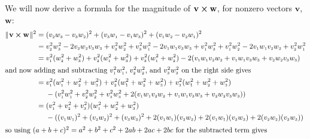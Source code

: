We will now derive a formula for the magnitude of $\mathbf{v} \bm{\times} \mathbf{w}$, for nonzero vectors $\mathbf{v}$,
$\mathbf{w}$:
\begin{align*}\begin{split}
 \norm{\Crossprod{\mathbf{v}}{\mathbf{w}}}^2 &= (\ssub{v}{2}\ssub{w}{3} - \ssub{v}{3}\ssub{w}{2})^2 +
  (\ssub{v}{3}\ssub{w}{1} - \ssub{v}{1}\ssub{w}{3})^2 + (\ssub{v}{1}\ssub{w}{2} - \ssub{v}{2}\ssub{w}{1})^2\\
  &= \ssub{v}{2}^{2}\ssub{w}{3}^{2} - 2\ssub{v}{2}\ssub{w}{2}\ssub{v}{3}\ssub{w}{3} + \ssub{v}{3}^{2}\ssub{w}{2}^{2} +
  \ssub{v}{3}^{2}\ssub{w}{1}^{2} - 2\ssub{v}{1}\ssub{w}{1}\ssub{v}{3}\ssub{w}{3} + \ssub{v}{1}^{2}\ssub{w}{3}^{2} +
  \ssub{v}{1}^{2}\ssub{w}{2}^{2} - 2\ssub{v}{1}\ssub{w}{1}\ssub{v}{2}\ssub{w}{2} + \ssub{v}{2}^{2}\ssub{w}{1}^{2}\\
  &= \ssub{v}{1}^{2}(\ssub{w}{2}^{2} + \ssub{w}{3}^{2}) + \ssub{v}{2}^{2}(\ssub{w}{1}^{2} + \ssub{w}{3}^{2}) +
  \ssub{v}{3}^{2}(\ssub{w}{1}^{2} + \ssub{w}{2}^{2})
   - 2(\ssub{v}{1}\ssub{w}{1}\ssub{v}{2}\ssub{w}{2} +
     \ssub{v}{1}\ssub{w}{1}\ssub{v}{3}\ssub{w}{3} + \ssub{v}{2}\ssub{w}{2}\ssub{v}{3}\ssub{w}{3})\\
  \intertext{and now adding and subtracting $\ssub{v}{1}^{2}\ssub{w}{1}^{2}$, $\ssub{v}{2}^{2}\ssub{w}{2}^{2}$, and
  $\ssub{v}{3}^{2}\ssub{w}{3}^{2}$ on the right side gives}
  &= \ssub{v}{1}^{2}(\ssub{w}{1}^{2} + \ssub{w}{2}^{2} + \ssub{w}{3}^{2}) +
  \ssub{v}{2}^{2}(\ssub{w}{1}^{2} + \ssub{w}{2}^{2} + \ssub{w}{3}^{2}) +
  \ssub{v}{3}^{2}(\ssub{w}{1}^{2} + \ssub{w}{2}^{2} + \ssub{w}{3}^{2})\\
  &\mathrel{\phantom{=}} {} - (\ssub{v}{1}^{2}\ssub{w}{1}^{2} + \ssub{v}{2}^{2}\ssub{w}{2}^{2} +
   \ssub{v}{3}^{2}\ssub{w}{3}^{2} + 2(\ssub{v}{1}\ssub{w}{1}\ssub{v}{2}\ssub{w}{2} +
   \ssub{v}{1}\ssub{w}{1}\ssub{v}{3}\ssub{w}{3} + \ssub{v}{2}\ssub{w}{2}\ssub{v}{3}\ssub{w}{3}))\\
  &= (\ssub{v}{1}^{2} + \ssub{v}{2}^{2} + \ssub{v}{3}^{2})(\ssub{w}{1}^{2} + \ssub{w}{2}^{2} + \ssub{w}{3}^{2})\\
  &\mathrel{\phantom{=}} {} - ((\ssub{v}{1}\ssub{w}{1})^2 + (\ssub{v}{2}\ssub{w}{2})^2 + (\ssub{v}{3}\ssub{w}{3})^2 +
   2(\ssub{v}{1}\ssub{w}{1})(\ssub{v}{2}\ssub{w}{2}) + 2(\ssub{v}{1}\ssub{w}{1})(\ssub{v}{3}\ssub{w}{3}) +
   2(\ssub{v}{2}\ssub{w}{2})(\ssub{v}{3}\ssub{w}{3}))\end{split}\\
  \intertext{so using $(a + b + c)^2 = a^2 + b^2 + c^2 + 2ab + 2ac + 2bc$ for the subtracted term gives}

\end{align*}
